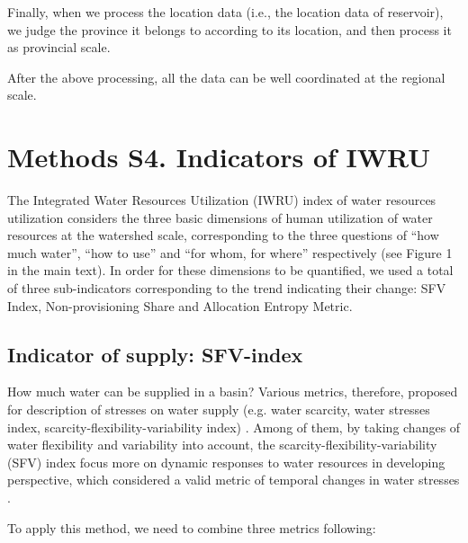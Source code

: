 \documentclass[9pt,twoside,lineno]{pnas-new}
\begin{document}
Finally, when we process the location data (i.e., the location data of reservoir), we judge the province it belongs to according to its location, and then process it as provincial scale. 

After the above processing, all the data can be well coordinated at the regional scale.

\newpage
\section*{Methods S4. Indicators of IWRU}
The Integrated Water Resources Utilization (IWRU) index of water resources utilization considers the three basic dimensions of human utilization of water resources at the watershed scale, corresponding to the three questions of ``how much water'', ``how to use'' and ``for whom, for where'' respectively (see Figure 1 in the main text). 
In order for these dimensions to be quantified, we used a total of three sub-indicators corresponding to the trend indicating their change: SFV Index, Non-provisioning Share and Allocation Entropy Metric.

\subsection*{Indicator of supply: SFV-index}
	How much water can be supplied in a basin? 
    Various metrics, therefore, proposed for description of stresses on water supply (e.g. water scarcity, water stresses index, scarcity-flexibility-variability index) 
    \cite{qinFlexibilityintensityglobal2019,bestAnthropogenicstressesworld2019,florke2018}.
    Among of them, by taking changes of water flexibility and variability into account,	the scarcity-flexibility-variability (SFV) index focus more on dynamic responses to water resources in developing perspective, which considered a valid metric of temporal changes in water stresses \cite{qinFlexibilityintensityglobal2019}.
    
	To apply this method, we need to combine three metrics following: 
	
\end{document}
